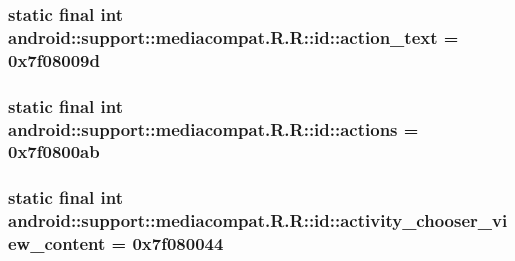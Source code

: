 \hypertarget{classandroid_1_1support_1_1mediacompat_1_1_r_1_1id_953f86ada13bc9d350b27cb57de0d479}{
\subsubsection[{action\_\-text}]{\setlength{\rightskip}{0pt plus 5cm}static final int android::support::mediacompat.R.R::id::action\_\-text = 0x7f08009d}}
\label{classandroid_1_1support_1_1mediacompat_1_1_r_1_1id_953f86ada13bc9d350b27cb57de0d479}


\hypertarget{classandroid_1_1support_1_1mediacompat_1_1_r_1_1id_b1ee72a8625bbd594b2157df69a204b0}{
\subsubsection[{actions}]{\setlength{\rightskip}{0pt plus 5cm}static final int android::support::mediacompat.R.R::id::actions = 0x7f0800ab}}
\label{classandroid_1_1support_1_1mediacompat_1_1_r_1_1id_b1ee72a8625bbd594b2157df69a204b0}


\hypertarget{classandroid_1_1support_1_1mediacompat_1_1_r_1_1id_63606b359c7a87a90ed18bfab848dc90}{
\subsubsection[{activity\_\-chooser\_\-view\_\-content}]{\setlength{\rightskip}{0pt plus 5cm}static final int android::support::mediacompat.R.R::id::activity\_\-chooser\_\-view\_\-content = 0x7f080044}}
\label{classandroid_1_1support_1_1mediacompat_1_1_r_1_1id_63606b359c7a87a90ed18bfab848dc90}


